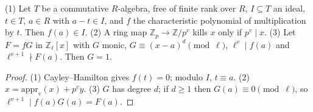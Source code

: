 \begin{lemma}\label{inf:hz-mazur-core}
  \leanok
  (1) Let $T$ be a commutative $R$-algebra, free of finite rank over $R$, $I\subseteq T$ an ideal, $t\in T$, $a\in R$ with $a-t\in I$, and $f$ the
  characteristic polynomial of multiplication by $t$. Then $f(a)\in I$. (2) A ring map $\mathbb Z_p\to\mathbb Z/p^v$ kills $x$ only if
  $p^v\mid x$. (3) Let $F=fG$ in $\mathbb Z_\ell[x]$ with $G$ monic, $G\equiv(x-a)^d\pmod\ell$, $\ell^v\mid f(a)$ and $\ell^{v+1}\nmid F(a)$.
  Then $G=1$.
\end{lemma}
\begin{proof}
  \leanok
  (1) Cayley--Hamilton gives $f(t)=0$; modulo $I$, $t\equiv a$. (2) $x=\mathrm{appr}_v(x)+p^vy$. (3) $G$ has degree $d$; if $d\ge1$ then
  $G(a)\equiv0\pmod\ell$, so $\ell^{v+1}\mid f(a)G(a)=F(a)$.
\end{proof}

